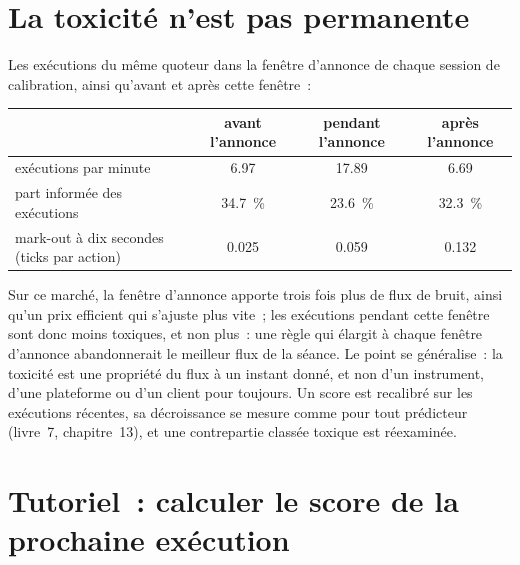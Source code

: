 \section{La toxicité n'est pas permanente}

Les exécutions du même quoteur dans la fenêtre d'annonce de chaque session de calibration, ainsi qu'avant et après cette fenêtre~:

\begin{center}
\small
\begin{tabular}{@{}lccc@{}}
\toprule
& avant l'annonce & pendant l'annonce & après l'annonce\\
\midrule
exécutions par minute & 6.97 & 17.89 & 6.69\\
part informée des exécutions & 34.7~\% & 23.6~\% & 32.3~\%\\
mark-out à dix secondes (ticks par action) & 0.025 & 0.059 & 0.132\\
\bottomrule
\end{tabular}
\end{center}

Sur ce marché, la fenêtre d'annonce apporte trois fois plus de flux de bruit, ainsi qu'un prix efficient qui s'ajuste plus vite~; les exécutions pendant cette fenêtre sont donc moins toxiques, et non
plus~: une règle qui élargit à chaque fenêtre d'annonce abandonnerait le meilleur flux de la séance. Le point se généralise~: la toxicité est une propriété du flux
à un instant donné, et non d'un instrument, d'une plateforme ou d'un client pour toujours. Un score est recalibré sur les exécutions récentes, sa décroissance se mesure comme pour tout prédicteur
(livre~7, chapitre~13), et une contrepartie classée toxique est réexaminée.

\section{Tutoriel~: calculer le score de la prochaine exécution}\label{tut:hf:adverse-selection-and-toxicity:tut}

